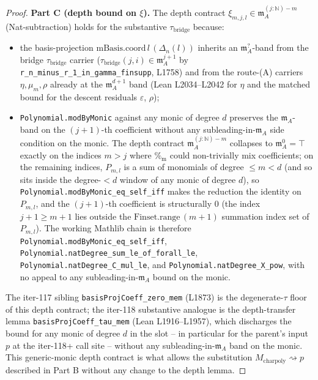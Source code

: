 \begin{proof}
\textbf{Part C (depth bound on $\xi$).} The depth contract
$\xi_{m,j,l} \in \mathfrak m_A^{(j : \mathbb N) - m}$
(Nat-subtraction) holds for the substantive $\tau_{\mathrm{bridge}}$
because:
\begin{itemize}
\item the basis-projection
$\mathrm{mBasis.coord}\,l\,(\Delta_n(l))$ inherits an
$\mathfrak m_A^{?}$-band from the bridge $\tau_{\mathrm{bridge}}$
carrier ($\tau_{\mathrm{bridge}}(j, i) \in \mathfrak m_A^{j + 1}$
by \texttt{r\_n\_minus\_r\_1\_in\_gamma\_finsupp}, L1758) and
from the route-(A) carriers $\eta, \mu_m, \rho$ already at the
$\mathfrak m_A^{d + 1}$ band (Lean L2034--L2042 for $\eta$ and
the matched bound for the descent residuals $\varepsilon$,
$\rho$);
\item \texttt{Polynomial.modByMonic} against any monic of degree
$d$ preserves the $\mathfrak m_A$-band on the $(j + 1)$-th
coefficient without any subleading-in-$\mathfrak m_A$ side
condition on the monic. The depth contract
$\mathfrak m_A^{(j : \mathbb N) - m}$ collapses to
$\mathfrak m_A^0 = \top$ exactly on the indices $m > j$ where
$\mathbin{\%_{\mathrm{m}}}$ could non-trivially mix
coefficients; on the remaining indices, $P_{m,l}$ is a sum of
monomials of degree $\le m < d$ (and so sits inside the
degree-$< d$ window of any monic of degree $d$), so
\texttt{Polynomial.modByMonic\_eq\_self\_iff} makes the reduction
the identity on $P_{m,l}$, and the $(j + 1)$-th coefficient is
structurally $0$ (the index $j + 1 \ge m + 1$ lies outside the
$\mathrm{Finset.range}\,(m + 1)$ summation index set of
$P_{m,l}$). The working Mathlib chain is therefore
\texttt{Polynomial.modByMonic\_eq\_self\_iff},
\texttt{Polynomial.natDegree\_sum\_le\_of\_forall\_le},
\texttt{Polynomial.natDegree\_C\_mul\_le}, and
\texttt{Polynomial.natDegree\_X\_pow}, with no appeal to any
subleading-in-$\mathfrak m_A$ bound on the monic.
\end{itemize}
The iter-117 sibling \texttt{basisProjCoeff\_zero\_mem} (L1873)
is the degenerate-$\tau$ floor of this depth contract; the
iter-118 substantive analogue is the depth-transfer lemma
\texttt{basisProjCoeff\_tau\_mem} (Lean L1916--L1957), which
discharges the bound for any monic of degree $d$ in the slot --
in particular for the parent's input $p$ at the iter-118+ call
site -- without any subleading-in-$\mathfrak m_A$ band on the
monic. This generic-monic depth contract is what allows the
substitution $M_{\mathrm{charpoly}} \rightsquigarrow p$ described
in Part B without any change to the depth lemma.


\end{proof}
